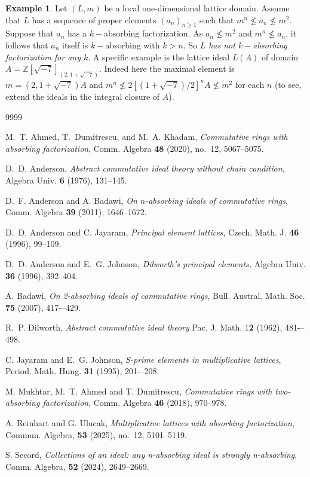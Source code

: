 \documentclass{amsart}
\theoremstyle{plain}
\theoremstyle{definition}
\newtheorem{example}[theorem]{Example}
\theoremstyle{remark}
\begin{document}
\begin{example}  
Let $(L,m)$ be a local one-dimensional lattice domain.
Assume that $L$ has a sequence of proper elements  $(a_n)_{n\geq 1}$  such that  $m^n\not\leq a_n\not\leq m^2$. 
Suppose that $a_n$ has a $k-$absorbing factorization. As $a_n\not\leq m^2$ and $m^n\not\leq a_n$, it follows that $a_n$   itself is $k-$absorbing with $k>n$.
So {\em $L$ has not $k-$absorbing factorization for any $k$}.
A specific example is the lattice ideal $L(A)$ of domain 
$A=\mathbb{Z}[\sqrt{-7}]_{(2,1+\sqrt{-7})}$. Indeed here the maximal element is $m=(2,1+\sqrt{-7})A$ and
$m^n\not\leq 2[(1+\sqrt{-7})/2]^nA\not\leq m^2$ for each $n$ (to see, extend the ideals in the integral closure of $A$).
\end{example} 


\begin{thebibliography}{9999}

  M.~T. Ahmed, T.~Dumitrescu, and M.~A. Khadam,
\emph{Commutative rings with absorbing factorization},
Comm. Algebra \textbf{48} (2020), no.~12, 5067--5075.
 
 D.~D. Anderson, \emph{Abstract commutative ideal theory without chain condition}, Algebra Univ. \textbf{6} (1976), 131--145.


  D.~F. Anderson and A. Badawi, \emph{On $n$-absorbing ideals of commutative rings}, Comm. Algebra {\bf 39} (2011), 1646--1672.

  D.~D. Anderson and C. Jayaram, \emph{Principal element lattices}, Czech. Math. J. \textbf{46} (1996), 99--109.

 D.~D. Anderson and E.~G. Johnson, \emph{Dilworth's principal elements,} Algebra Univ. \textbf{36} (1996), 392--404.


 A. Badawi, \emph{On 2-absorbing ideals of commutative rings}, Bull. Austral. Math. Soc. {\bf 75} (2007), 417-–429. 


 R.~P. Dilworth, \emph{Abstract commutative ideal theory} Pac. J. Math. {1\bf 2} (1962), 481-–498.



 C. Jayaram and E.~G. Johnson, \emph{S-prime elements in multiplicative lattices}, Period. Math. Hung. {\bf 31} (1995), 201-–208. 

 M. Mukhtar, M.~T. Ahmed and T. Dumitrescu, \emph{Commutative rings with two-absorbing factorization}, Comm. Algebra {\bf 46} (2018), 970--978.

 A. Reinhart and G. Ulucak, \emph{Multiplicative lattices with absorbing factorization}, Commun. Algebra, {\bf 53} (2025), no.~12, 5101--5119.

 S. Secord, \emph{Collections of an ideal: any n-absorbing ideal is strongly n-absorbing}, 
Comm. Algebra, {\bf 52} (2024), 2649--2669.
\end{thebibliography}
\end{document}
